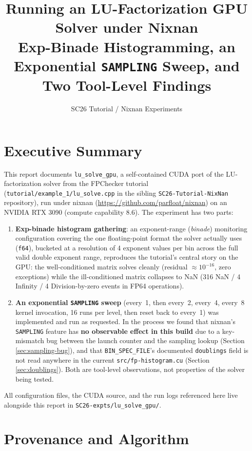 \documentclass[11pt,a4paper]{article}
\title{Running an LU-Factorization GPU Solver under Nixnan\\
\large Exp-Binade Histogramming, an Exponential \texttt{SAMPLING} Sweep, and Two Tool-Level Findings}
\author{SC26 Tutorial / Nixnan Experiments}
\date{}
\begin{document}
\maketitle

\section{Executive Summary}

This report documents \texttt{lu\_solve\_gpu}, a self-contained CUDA port of
the LU-factorization solver from the FPChecker tutorial
(\texttt{tutorial/example\_1/lu\_solve.cpp} in the sibling
\texttt{SC26-Tutorial-NixNan} repository), run under nixnan
(\url{https://github.com/parfloat/nixnan}) on an NVIDIA RTX 3090
(compute capability 8.6). The experiment has two parts:

\begin{enumerate}
  \item \textbf{Exp-binade histogram gathering}: an exponent-range
    (\emph{binade}) monitoring configuration covering the one floating-point
    format the solver actually uses (\texttt{f64}), bucketed at a resolution
    of 4 exponent values per bin across the full valid double exponent
    range, reproduces the tutorial's central story on the GPU: the
    well-conditioned matrix solves cleanly (residual $\approx 10^{-16}$,
    zero exceptions) while the ill-conditioned matrix collapses to NaN
    (316 NaN / 4 Infinity / 4 Division-by-zero events in FP64 operations).
  \item \textbf{An exponential \texttt{SAMPLING} sweep} (every~1, then
    every~2, every~4, every~8 kernel invocation, 16 runs per level, then
    reset back to every~1) was implemented and run as requested. In the
    process we found that nixnan's \texttt{SAMPLING} feature has
    \textbf{no observable effect in this build} due to a key-mismatch bug
    between the launch counter and the sampling lookup (Section
    \ref{sec:sampling-bug}), and that \texttt{BIN\_SPEC\_FILE}'s documented
    \texttt{doublings} field is not read anywhere in the current
    \texttt{src/fp-histogram.cu} (Section \ref{sec:doublings}). Both are
    tool-level observations, not properties of the solver being tested.
\end{enumerate}

All configuration files, the CUDA source, and the run logs referenced here
live alongside this report in \texttt{SC26-expts/lu\_solve\_gpu/}.

\section{Provenance and Algorithm}
\end{document}
